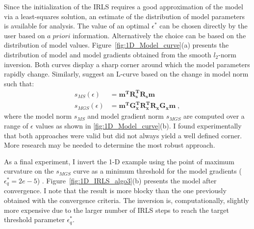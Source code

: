 Since the initialization of the IRLS requires a good approximation of the model via a least-squares solution, an estimate of the distribution of model parameters is available for analysis.
The value of an optimal $\epsilon^*$ can be chosen directly by the user based on $a\;priori$ information. Alternatively the choice can be based on the distribution of model values.
Figure~\ref{fig:1D_Model_curve}(a) presents the distribution of model and model gradients obtained from the smooth $l_2$-norm inversion.
Both curves display a sharp corner around which the model parameters rapidly change. 
Similarly, \cite{ZhdanovTolstaya2004} suggest an L-curve based on the change in model norm such that:
\begin{equation}\label{s_ms}
\begin{split}
s_{MS}(\epsilon) &= \mathbf{m^T R_\text{s}^T R_\text{s} m} \\
s_{MGS}(\epsilon) &= \mathbf{m^T G_\text{x}^T R_\text{x}^T R_\text{x} G_\text{x} m}\;,
\end{split}
\end{equation}
where the model norm $s_{MS}$ and model gradient norm $s_{MGS}$ are computed over a range of $\epsilon$ values as shown in \ref{fig:1D_Model_curve}(b). I found experimentally that both approaches were valid but did not always yield a well defined corner.
More research may be needed to determine the most robust approach.

As a final experiment, I invert the 1-D example using the point of maximum curvature on the $s_{MGS}$ curve as a minimum threshold  for the model gradients  ($\epsilon_q^*=2e-5$) . Figure~\ref{fig:1D_IRLS_algo3}(b) presents the model after convergence.
I note that the result is more blocky than the one previously obtained with the convergence criteria.
The inversion is, computationally, slightly more expensive due to the larger number of IRLS steps to reach the target threshold parameter $\epsilon_q^*$. 


